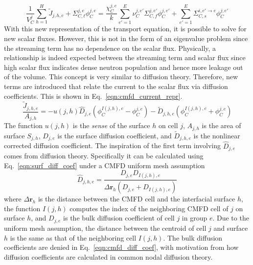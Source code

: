 \begin{equation}
	\frac{1}{V_C^j} \sum_{h=1}^H \tilde{J}_{j,h,e} + \Sigma_{C,t}^{j,e} \phi_C^{j,e} = \frac{\chi_C^{j,e}}{k} \sum_{e'=1}^{E} \nu_C^{j, e'} \Sigma_{C,f}^{j,e'} \phi_C^{j,e'} + \sum_{e'=1}^E  \Sigma_{C,s}^{i, e' \rightarrow e} \phi_C^{j,e'}
	\label{eqn:transport_partial_current_1}
\end{equation}
With this new representation of the transport equation, it is possible to solve for new scalar fluxes. However, this is not in the form of an eigenvalue problem since the streaming term has no dependence on the scalar flux. Physically, a relationship is indeed expected between the streaming term and scalar flux since high scalar flux indicates dense neutron population and hence more leakage out of the volume. This concept is very similar to diffusion theory. Therefore, new terms are introduced that relate the current to the scalar flux via diffusion coefficients. This is shown in Eq.~\ref{eqn:cmfd_current_repr}.
\begin{equation}
	\frac{\tilde{J}_{j,h,e}}{A_{j,h}} = - u(j,h) \hat{D}_{j,e} \left(\phi_C^{I(j,h),e} - \phi_C^{j,e}\right) - \tilde{D}_{j,h,e} \left(\phi_C^{I(j,h),e} + \phi_C^{j,e}\right)
	\label{eqn:cmfd_current_repr}
\end{equation}
The function $u(j,h)$ is the \textit{sense} of the surface $h$ on cell $j$, $A_{j,h}$ is the area of surface $S_{j,h}$, $\hat{D}_{j,e}$ is the surface diffusion coefficient, and $\tilde{D}_{j,h,e}$ is the nonlinear corrected diffusion coefficient. The inspiration of the first term involving $\hat{D}_{j,e}$ comes from diffusion theory. Specifically it can be calculated using Eq.~\ref{eqn:surf_diff_coef} under a CMFD uniform mesh assumption
\begin{equation}
	\hat{D}_{j,h,e} = \frac{D_{j,e} D_{I(j,h),e}}{\Delta \mathbf{r}_h \left( D_{j,e} + D_{I(j,h),e} \right)}
	\label{eqn:surf_diff_coef}
\end{equation}
where $\Delta \mathbf{r}_h$ is the distance between the CMFD cell and the interfacial surface $h$, the function $I(j,h)$ computes the index of the neighboring CMFD cell of $j$ on surface $h$, and $D_{j,e}$ is the bulk diffusion coefficient of cell $j$ in group $e$. Due to the uniform mesh assumption, the distance between the centroid of cell $j$ and surface $h$ is the same as that of the neighboring cell $I(j,h)$. The bulk diffusion coefficients are denied in Eq.~\ref{eqn:cmfd_diff_coef}, with motivation from how diffusion coefficients are calculated in common nodal diffusion theory.
